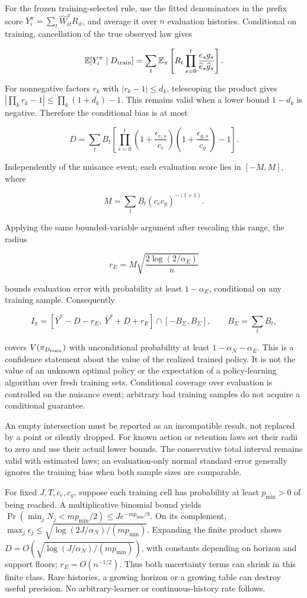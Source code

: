 For the frozen training-selected rule, use the fitted denominators in
the prefix score \(Y_i^\pi=\sum_t\widehat W_{it}^\pi R_{it}\), and
average it over \(n\) evaluation histories. Conditional on training,
cancellation of the true observed law gives

\[
 \mathbb E[Y_i^\pi\mid D_{\rm train}]
 =\sum_t\mathbb E_\pi\left[R_t
 \prod_{s=0}^t\frac{e_sg_s}{\widehat e_s\widehat g_s}\right].
\]

For nonnegative factors \(r_k\) with \(|r_k-1|\le d_k\), telescoping the
product gives \(|\prod_k r_k-1|\le\prod_k(1+d_k)-1\). This remains valid
when a lower bound \(1-d_k\) is negative. Therefore the conditional bias
is at most

\[
 D=\sum_t B_t\left[
 \prod_{s=0}^t
 \left(1+\frac{\epsilon_{e,s}}{c_e}\right)
 \left(1+\frac{\epsilon_{g,s}}{c_g}\right)-1\right].
\]

Independently of the nuisance event, each evaluation score lies in
\([-M,M]\), where

\[
 M=\sum_t B_t(c_ec_g)^{-(t+1)}.
\]

Applying the same bounded-variable argument after rescaling this range,
the radius

\[
 r_E=M\sqrt{\frac{2\log(2/\alpha_E)}{n}}
\]

bounds evaluation error with probability at least \(1-\alpha_E\),
conditional on any training sample. Consequently

\[
 I_\pi=[\bar Y^\pi-D-r_E,\ \bar Y^\pi+D+r_E]
 \cap[-B_\Sigma,B_\Sigma],\qquad B_\Sigma=\sum_t B_t,
\]

covers \(V(\pi_{D_{\rm train}})\) with unconditional probability at
least \(1-\alpha_N-\alpha_E\). This is a confidence statement about the
value of the realized trained policy. It is not the value of an unknown
optimal policy or the expectation of a policy-learning algorithm over
fresh training sets. Conditional coverage over evaluation is controlled
on the nuisance event; arbitrary bad training samples do not acquire a
conditional guarantee.

An empty intersection must be reported as an incompatible result, not
replaced by a point or silently dropped. For known action or retention
laws set their radii to zero and use their actual lower bounds. The
conservative total interval remains valid with estimated laws; an
evaluation-only normal standard error generally ignores the training
bias when both sample sizes are comparable.

For fixed \(J,T,c_e,c_g\), suppose each training cell has probability at
least \(p_{\min}>0\) of being reached. A multiplicative binomial bound
yields \(\Pr(\min_j N_j<mp_{\min}/2)\le J e^{-mp_{\min}/8}\). On its
complement, \(\max_j\epsilon_j\le\sqrt{\log(2J/\alpha_N)/(mp_{\min})}\).
Expanding the finite product shows
\(D=O(\sqrt{\log(J/\alpha_N)/(mp_{\min})})\), with constants depending
on horizon and support floors; \(r_E=O(n^{-1/2})\). Thus both
uncertainty terms can shrink in this finite class. Rare histories, a
growing horizon or a growing table can destroy useful precision. No
arbitrary-learner or continuous-history rate follows.

